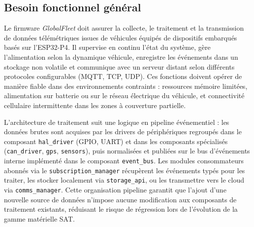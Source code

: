\newpage

\subsection{Besoin fonctionnel général}
\label{subsec:besoin_fonc}

Le firmware \textit{GlobalFleet} doit assurer la collecte, le
traitement et la transmission de données télémétriques issues de
véhicules équipés de dispositifs embarqués basés sur l'ESP32-P4. Il
supervise en continu l'état du système, gère l'alimentation selon la
dynamique véhicule, enregistre les événements dans un stockage non
volatile et communique avec un serveur distant selon différents
protocoles configurables (MQTT, TCP, UDP). Ces fonctions doivent
opérer de manière fiable dans des environnements contraints :
ressources mémoire limitées, alimentation sur batterie ou sur le
réseau électrique du véhicule, et connectivité cellulaire
intermittente dans les zones à couverture partielle.

L'architecture de traitement suit une logique en pipeline
événementiel : les données brutes sont acquises par les drivers de
périphériques regroupés dans le composant \texttt{hal\_driver} (GPIO,
UART) et dans les composants spécialisés (\texttt{can\_driver},
\texttt{gps}, \texttt{sensors}), puis normalisées et publiées sur
le bus d'événements interne implémenté dans le composant
\texttt{event\_bus}. Les modules consommateurs abonnés via le
\texttt{subscription\_manager} récupèrent les événements typés pour
les traiter, les stocker localement via \texttt{storage\_api}, ou
les transmettre vers le cloud via \texttt{comms\_manager}. Cette
organisation pipeline garantit que l'ajout d'une nouvelle source de
données n'impose aucune modification aux composants de traitement
existants, réduisant le risque de régression lors de l'évolution
de la gamme matérielle SAT.

